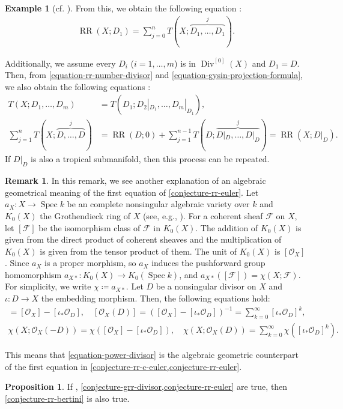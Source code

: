 \documentclass[a4paper,dvipdfmx,reqno,12pt]{amsart}
\theoremstyle{definition}
\newtheorem{example}[theorem]{Example}
\newtheorem{proposition}[theorem]{Proposition}
\newtheorem{remark}[theorem]{Remark}
\newcommand{\deq}{\coloneqq}
\newcommand{\opn}[1]{\operatorname{#1}}
\numberwithin{equation}{section}
\begin{document}
\begin{example}[{cf. \cite[Chapter 13 Appendix]{MR2810322}}]
From this, we obtain the following equation
\cite[.(14)]{MR1335917}:
\begin{align}
\opn{RR}(X;D_1)=\sum_{j=0}^{n}T(X;\overbrace{D_1,\ldots,D_1}^{j}).
\end{align}

Additionally, we assume every $D_i$ ($i=1,\ldots,m$) is
in $\opn{Div}^{[0]}(X)$ and $D_1=D$.
Then, from 
\cref{equation-rr-number-divisor} and
\cref{equation-gysin-projection-formula},
we also obtain the following equations \cite[Theorem 11.2.1]{MR1335917}:
\begin{align}
T(X;D_1,\ldots,D_m)&=T(D_1;D_2|_{D_1},\ldots,D_m|_{D_1}), \\
\sum_{j=1}^{n}T(X;\overbrace{D,\ldots,D}^{j})
&=\opn{RR}(D;0)+\sum_{j=1}^{n-1}T(D;\overbrace{D|_D,\ldots,D|_{D}}^{j})
=\opn{RR}(X;D|_D).
\label{equation-rr-reduction}
\end{align}
If $D|_D$ is also a tropical submanifold,
then this process can be repeated.
\end{example}

\begin{remark}
\label{remark-grothendieck-group}
In this remark, we see another explanation
of an algebraic geometrical meaning of the first
equation of \cref{conjecture-rr-euler}.
Let $a_X\colon X\to \opn{Spec}k$
be an complete nonsingular algebraic variety over $k$
and $K_0(X)$ the Grothendieck ring of $X$
(see, e.g., \cite[]{MR1644323}).
For a coherent sheaf $\mathcal{F}$ on $X$, 
let $[\mathcal{F}]$ be the isomorphism class of
$\mathcal{F}$ in $K_0(X)$.
The addition of $K_0(X)$ is given from
the direct product of coherent sheaves and
the multiplication of $K_0(X)$ is given
from the tensor product of them.   
The unit of $K_0(X)$ is $[\mathcal{O}_X]$.
Since $a_X$ is a proper morphism, so $a_X$
induces the pushforward group homomorphism
$a_{X*}\colon K_0(X)\to K_0(\opn{Spec}k)$,
and $a_{X*}([\mathcal{F}])=
\chi(X;\mathcal{F})$.
For simplicity, we write $\chi\deq a_{X*}$.
Let $D$ be a nonsingular divisor on $X$ and 
$\iota\colon D\to X$ the embedding morphism.
Then, the following equations hold:
\begin{align}
[\mathcal{O}_X(-D)]=
[\mathcal{O}_X]-[\iota_*\mathcal{O}_{D}], \quad
[\mathcal{O}_X(D)]=
([\mathcal{O}_X]-[\iota_*\mathcal{O}_{D}])^{-1}
=\sum_{k=0}^{\infty}[\iota_*\mathcal{O}_D]^{k}, \\
\chi(X;\mathcal{O}_X(-D))=
\chi([\mathcal{O}_X]-[\iota_*\mathcal{O}_{D}]), \quad
\chi(X;\mathcal{O}_X(D))=
\sum_{k=0}^{\infty}\chi([\iota_*\mathcal{O}_D]^{k}).
\label{equation-power-divisor}
\end{align}
\end{remark}
This means that \eqref{equation-power-divisor} is 
the algebraic geometric counterpart of
the first equation in
\cref{conjecture-rr-c-euler,conjecture-rr-euler}.
\begin{proposition}
If \label{proposition-euler-to-bertini}
\cite[Conjecture 6.13]{demedrano2023chern},
\cref{conjecture-grr-divisor,conjecture-rr-euler}
are true, then \cref{conjecture-rr-bertini} is also true. 
\end{proposition}
\end{document}
